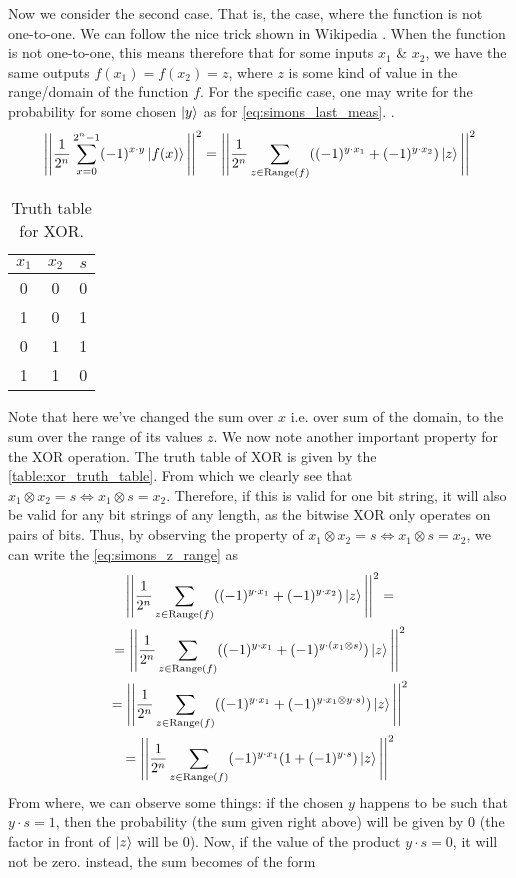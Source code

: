 Now we consider the second case. That is, the case, where the function is not one-to-one. We can follow the nice trick shown 
in Wikipedia \cite{noauthor_simons_2023}. When the function is not one-to-one, this means therefore that for some inputs $x_1$ \& $x_2$,
we have the same outputs $f(x_1)=f(x_2)=z$, where $z$ is some kind of value in the range/domain of the function $f$. For the specific case, one may write for 
the probability for some chosen $\ket{y}$ as for \autoref{eq:simons_last_meas}.
\cite{noauthor_simons_2023}.
\begin{gather}
  \Bigg|\Bigg| \frac{1}{2^n}\sum_{x=0}^{2^n-1} (-1)^{x\cdot y} \ket{f(x)} \Bigg|\Bigg|^2 = 
  \Bigg|\Bigg| \frac{1}{2^n} \sum_{z\in \text{Range}(f)}((-1)^{y\cdot x_1} +(-1)^{y\cdot x_2})\ket{z} \Bigg| \Bigg|^2
  \label{eq:simons_z_range}
\end{gather}
\begin{wraptable}{l}{3cm}
  \centering
  \begin{tabular}{|c|c|c|}
    \hline
    $x_1$ & $x_2$ & $s$ \\
    \hline
    \hline
    0 & 0 & 0 \\
    \hline
    1 & 0 & 1 \\
    \hline
    0 & 1 & 1 \\
    \hline
    1 & 1 & 0 \\
    \hline
  \end{tabular}
  \caption{Truth table for XOR.}
  \vspace{-1.0cm}
  \label{table:xor_truth_table}
\end{wraptable}

Note that here we've changed the sum over $x$ i.e. over sum of the domain, to the sum over the range of its values $z$.
We now note another important property for the XOR operation. The truth table of XOR is given by the \autoref{table:xor_truth_table}.
From which we clearly see that $x_1 \otimes x_2 = s \iff x_1 \otimes s = x_2$. Therefore, if this is valid for one bit string, it 
will also be valid for any bit strings of any length, as the bitwise XOR only operates on pairs of bits.
Thus, by observing the property of $x_1 \otimes x_2 = s \iff x_1 \otimes s = x_2$, we can write the \autoref{eq:simons_z_range} 
as
\begin{gather}
  \Bigg|\Bigg| \frac{1}{2^n} \sum_{z\in \text{Range}(f)}((-1)^{y\cdot x_1} +(-1)^{y\cdot x_2})\ket{z} \Bigg| \Bigg|^2 =\\
  =\Bigg| \Bigg| \frac{1}{2^n} \sum_{z\in \text{Range}(f)}((-1)^{y\cdot x_1} +(-1)^{y\cdot (x_1 \otimes s)})\ket{z} \Bigg| \Bigg|^2 \\
  =\Bigg| \Bigg| \frac{1}{2^n} \sum_{z\in \text{Range}(f)}((-1)^{y\cdot x_1} +(-1)^{y\cdot x_1 \otimes y\cdot s)})\ket{z} \Bigg| \Bigg|^2 \\
  =\Bigg| \Bigg| \frac{1}{2^n} \sum_{z\in \text{Range}(f)} (-1)^{y\cdot x_1}(1+(-1)^{y\cdot s})\ket{z} \Bigg| \Bigg|^2 
\end{gather}
From where, we can observe some things: if the chosen $y$ happens to be such that $y\cdot s = 1$, then the probability (the sum given right above)
will be given by 0 (the factor in front of $\ket{z}$ will be 0). Now, if the value of the product $y\cdot s = 0$, it will not be zero.
instead, the sum becomes of the form 

